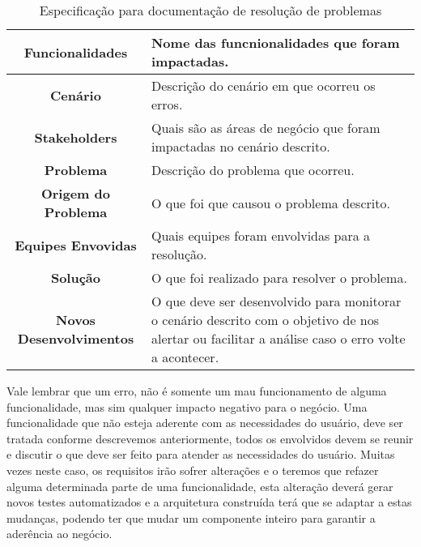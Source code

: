       \begin{table}[h!]
        \centering
        \begin{tabular}{|c|p{10cm}|}
          \hline
          \textbf{Funcionalidades} &
          Nome das funcnionalidades que foram impactadas. \\ \hline
          \textbf{Cenário} &
          Descrição do cenário em que ocorreu os erros. \\ \hline
          \textbf{Stakeholders} &
          Quais são as áreas de negócio que foram impactadas no cenário descrito. \\ \hline
          \textbf{Problema} &
          Descrição do problema que ocorreu. \\ \hline
          \textbf{Origem do Problema} &
          O que foi que causou o problema descrito. \\ \hline
          \textbf{Equipes Envovidas} &
          Quais equipes foram envolvidas para a resolução. \\ \hline
          \textbf{Solução} &
          O que foi realizado para resolver o problema. \\ \hline
          \textbf{Novos Desenvolvimentos} &
          O que deve ser desenvolvido para monitorar o cenário descrito com o
          objetivo de nos alertar ou facilitar a análise caso o erro volte a
          acontecer. \\ \hline
        \end{tabular}
        \caption{Especificação para documentação de resolução de problemas}
        \label{Tabela:12}
      \end{table}

      Vale lembrar que um erro, não é somente um mau funcionamento de alguma
      funcionalidade, mas sim qualquer impacto negativo para o negócio. Uma
      funcionalidade que não esteja aderente com as necessidades do usuário, deve
      ser tratada conforme descrevemos anteriormente, todos os envolvidos devem
      se reunir e discutir o que deve ser feito para atender as necessidades do
      usuário. Muitas vezes neste caso, os requisitos irão sofrer alterações e o
      teremos que refazer alguma determinada parte de uma funcionalidade, esta
      alteração deverá gerar novos testes automatizados e a arquitetura construída
      terá que se adaptar a estas mudanças, podendo ter que mudar um componente
      inteiro para garantir a aderência ao negócio.

